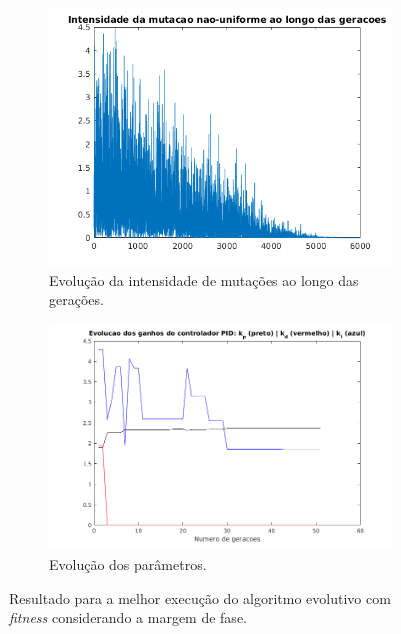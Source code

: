 \begin {enumerate}
\begin{figure}[h!]
		\begin{subfigure}{.5\textwidth}
		  \centering
		  \includegraphics[width=1\linewidth]{pid/melhor_fitness_pid_ex_d_5}
		  \caption{\centering Evolução da intensidade de mutações ao longo das
		  gerações.}
		  \label{fig:pid_mutacao_d_5}
		\end{subfigure}%
		\begin{subfigure}{.5\textwidth}
		  \centering
		  \includegraphics[width=1\linewidth]{pid/kp_kd_ki_pid_ex_d_5}
		  \caption{\centering Evolução dos parâmetros.}
		  \label{fig:pid_parametros_d_5} 
		\end{subfigure}
	
	\caption{Resultado para a melhor execução do algoritmo evolutivo com
	\textit{fitness} considerando a margem de fase.}
	\end{figure}
	

\end{enumerate}
